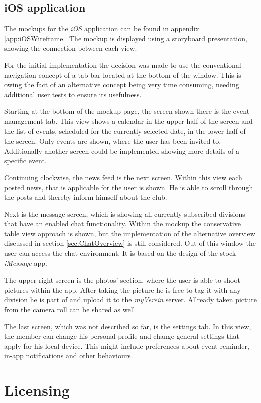 \subsection{iOS application}
\label{sec:iOSMockup}
The mockups for the \emph{iOS} application can be found in appendix \vref{app:iOSWireframe}. The mockup is displayed using a storyboard presentation, showing the connection between each view.

For the initial implementation the decision was made to use the conventional navigation concept of a tab bar located at the bottom of the window. This is owing the fact of an alternative concept being very time consuming, needing additional user tests to ensure its usefulness.

Starting at the bottom of the mockup page, the screen shown there is the event management tab. This view shows a calendar in the upper half of the screen and the list of events, scheduled for the currently selected date, in the lower half of the screen. Only events are shown, where the user has been invited to. Additionally another screen could be implemented showing more details of a specific event.

Continuing clockwise, the news feed is the next screen. Within this view each posted news, that is applicable for the user is shown. He is able to scroll through the posts and thereby inform himself about the club.

Next is the message screen, which is showing all currently subscribed divisions that have an enabled chat functionality. Within the mockup the conservative table view approach is shown, but the implementation of the alternative overview discussed in section \vref{sec:ChatOverview} is still considered. Out of this window the user can access the chat environment. It is based on the design of the stock \emph{iMessage} app.

The upper right screen is the photos' section, where the user is able to shoot pictures within the app. After taking the picture he is free to tag it with any division he is part of and upload it to the \emph{myVerein} server. Allready taken picture from the camera roll can be shared as well.

The last screen, which was not described so far, is the settings tab. In this view, the member can change his personal profile and change general settings that apply for his local device. This might include preferences about event reminder, in-app notifications and other behaviours.

\section{Licensing}

